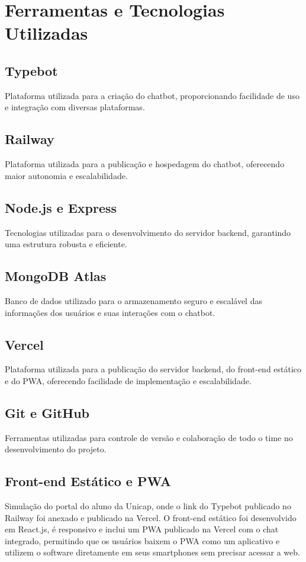 \documentclass[12pt,a4paper]{article} %
\begin{document}
\section{Ferramentas e Tecnologias Utilizadas}

\subsection{Typebot}
Plataforma utilizada para a criação do chatbot, proporcionando facilidade de uso e integração com diversas plataformas.

\subsection{Railway}
Plataforma utilizada para a publicação e hospedagem do chatbot, oferecendo maior autonomia e escalabilidade.

\subsection{Node.js e Express}
Tecnologias utilizadas para o desenvolvimento do servidor backend, garantindo uma estrutura robusta e eficiente.

\subsection{MongoDB Atlas}
Banco de dados utilizado para o armazenamento seguro e escalável das informações dos usuários e suas interações com o chatbot.

\subsection{Vercel}
Plataforma utilizada para a publicação do servidor backend, do front-end estático e do PWA, oferecendo facilidade de implementação e escalabilidade.

\subsection{Git e GitHub}
Ferramentas utilizadas para controle de versão e colaboração de todo o time no desenvolvimento do projeto.

\subsection{Front-end Estático e PWA}
Simulação do portal do aluno da Unicap, onde o link do Typebot publicado no Railway foi anexado e publicado na Vercel. O front-end estático foi desenvolvido em React.js, é responsivo e inclui um PWA publicado na Vercel com o chat integrado, permitindo que os usuários baixem o PWA como um aplicativo e utilizem o software diretamente em seus smartphones sem precisar acessar a web.
\end{document}
